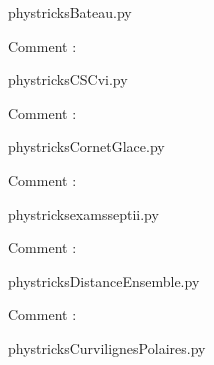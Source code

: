 
    \newcommand{\CaptionFigBateau}{<+Type your caption here+>}
    \begin{center}
        
    \end{center}
    phystricksBateau.py

    Comment : 

    \clearpage
    


    \newcommand{\CaptionFigCSCvi}{<+Type your caption here+>}
    \begin{center}
        
    \end{center}
    phystricksCSCvi.py

    Comment : 

    \clearpage
    


    \newcommand{\CaptionFigCornetGlace}{<+Type your caption here+>}
    \begin{center}
        
    \end{center}
    phystricksCornetGlace.py

    Comment : 

    \clearpage
    


    \newcommand{\CaptionFigexamsseptii}{<+Type your caption here+>}
    \begin{center}
        
    \end{center}
    phystricksexamsseptii.py

    Comment : 

    \clearpage
    


    \newcommand{\CaptionFigDistanceEnsemble}{<+Type your caption here+>}
    \begin{center}
        
    \end{center}
    phystricksDistanceEnsemble.py

    Comment : 

    \clearpage
    


    \newcommand{\CaptionFigCurvilignesPolaires}{<+Type your caption here+>}
    \begin{center}
        
    \end{center}
    phystricksCurvilignesPolaires.py

